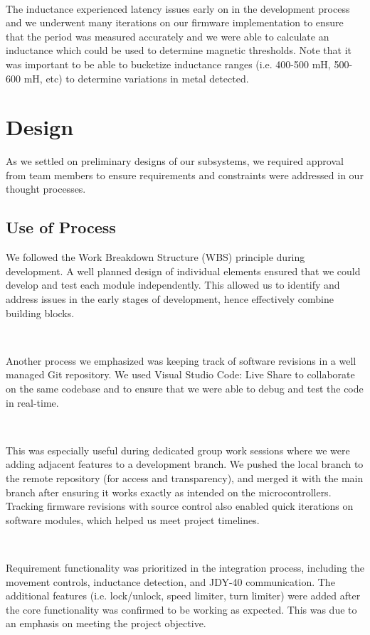 \documentclass{article}
\begin{document}
\

The inductance experienced latency issues early on in the development process and we underwent many iterations on our
firmware implementation to ensure that the period was measured accurately and we were able to calculate an inductance which could be
used to determine magnetic thresholds. Note that it was important to be able to bucketize inductance ranges
(i.e. 400-500 mH, 500-600 mH, etc) to determine variations in metal detected.

\section{Design}

As we settled on preliminary designs of our subsystems, we required approval from team members to ensure requirements and constraints
were addressed in our thought processes.

\subsection{Use of Process}

We followed the Work Breakdown Structure (WBS) principle during development. A well planned design of individual elements ensured that we could
develop and test each module independently. This allowed us to identify and address issues in the early stages of development, hence
effectively combine building blocks.

\

Another process we emphasized was keeping track of software revisions in a well managed Git repository. We used Visual Studio Code: Live Share
to collaborate on the same codebase and to ensure that we were able to debug and test the code in real-time.

\

This was especially useful during dedicated group work sessions where we were adding adjacent features to a development branch.
We pushed the local branch to the remote repository (for access and transparency), and merged it with the main branch after ensuring it works
exactly as intended on the microcontrollers. Tracking firmware revisions with source control also enabled quick iterations on software modules,
which helped us meet project timelines.

\

Requirement functionality was prioritized in the integration process, including the movement controls, inductance detection, and JDY-40 communication.
The additional features (i.e. lock/unlock, speed limiter, turn limiter) were added after the core functionality was confirmed to be working as expected. This was due to an emphasis
on meeting the project objective.
\end{document}
